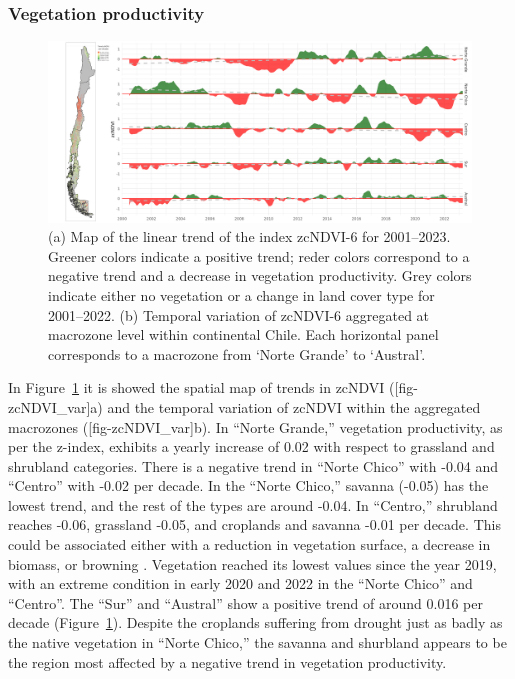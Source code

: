 \documentclass[
  authoryear,
  preprint,
  3p,
  onecolumn]{elsarticle}
\begin{document}
\hypertarget{vegetation-productivity}{%
\subsubsection{Vegetation productivity}\label{vegetation-productivity}}

\begin{figure}[!ht]

{\centering \includegraphics{../output/figs/temporal_variation_zcNDVI6_macrozonas_con_mapa.png}

}

\caption{\label{fig-zcNDVI_var}(a) Map of the linear trend of the index
zcNDVI-6 for 2001--2023. Greener colors indicate a positive trend; reder
colors correspond to a negative trend and a decrease in vegetation
productivity. Grey colors indicate either no vegetation or a change in
land cover type for 2001--2022. (b) Temporal variation of zcNDVI-6
aggregated at macrozone level within continental Chile. Each horizontal
panel corresponds to a macrozone from `Norte Grande' to `Austral'.}

\end{figure}

In Figure~\ref{fig-zcNDVI_var} it is showed the spatial map of trends in
zcNDVI ({[}fig-zcNDVI\_var{]}a) and the temporal variation of zcNDVI
within the aggregated macrozones ({[}fig-zcNDVI\_var{]}b). In ``Norte
Grande,'' vegetation productivity, as per the z-index, exhibits a yearly
increase of 0.02 with respect to grassland and shrubland categories.
There is a negative trend in ``Norte Chico'' with -0.04 and ``Centro''
with -0.02 per decade. In the ``Norte Chico,'' savanna (-0.05) has the
lowest trend, and the rest of the types are around -0.04. In ``Centro,''
shrubland reaches -0.06, grassland -0.05, and croplands and savanna
-0.01 per decade. This could be associated either with a reduction in
vegetation surface, a decrease in biomass, or browning
\citep{Miranda2023}. Vegetation reached its lowest values since the year
2019, with an extreme condition in early 2020 and 2022 in the ``Norte
Chico'' and ``Centro''. The ``Sur'' and ``Austral'' show a positive
trend of around 0.016 per decade (Figure~\ref{fig-zcNDVI_var}). Despite
the croplands suffering from drought just as badly as the native
vegetation in ``Norte Chico,'' the savanna and shurbland appears to be
the region most affected by a negative trend in vegetation productivity.
\end{document}
